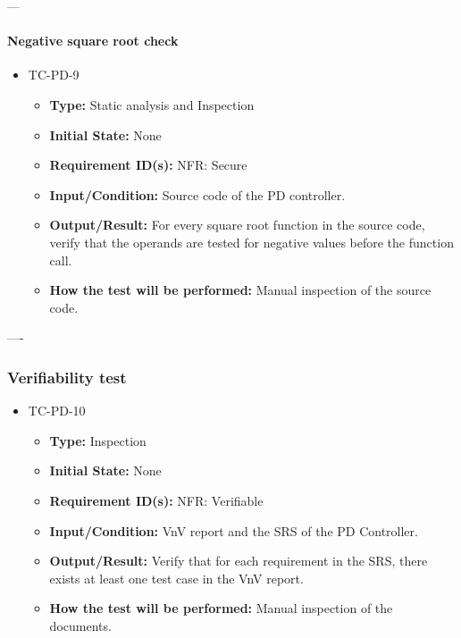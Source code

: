 \documentclass[12pt, titlepage]{article}
\begin{document}
---

\paragraph{Negative square root check}
\begin{itemize}
\item{TC-PD-9\\}
\begin{itemize}
\item{\textbf{Type:}} Static analysis and Inspection
					
\item{\textbf{Initial State:}} None

\item{\textbf{Requirement ID(s):}}  NFR: Secure
					
\item{\textbf{Input/Condition:}}  Source code of the PD controller.
					
\item{\textbf{Output/Result:}} For every square root function in the source code,
verify that the operands are tested for negative values before the function call.

\item{\textbf{How the test will be performed:}}  Manual inspection of the source code.
\end{itemize}
\end{itemize}

----

\subsubsection{Verifiability test}

\begin{itemize}
\item{TC-PD-10\\}
\begin{itemize}
\item{\textbf{Type:}} Inspection
					
\item{\textbf{Initial State:}} None

\item{\textbf{Requirement ID(s):}} NFR: Verifiable
					
\item{\textbf{Input/Condition:}} VnV report and the SRS of the PD Controller.
					
\item{\textbf{Output/Result:}} Verify that for each requirement in the SRS, there
exists at least one test case in the VnV report.
 
\item{\textbf{How the test will be performed:}} Manual inspection of the documents.
\end{itemize}
\end{itemize}
\end{document}
